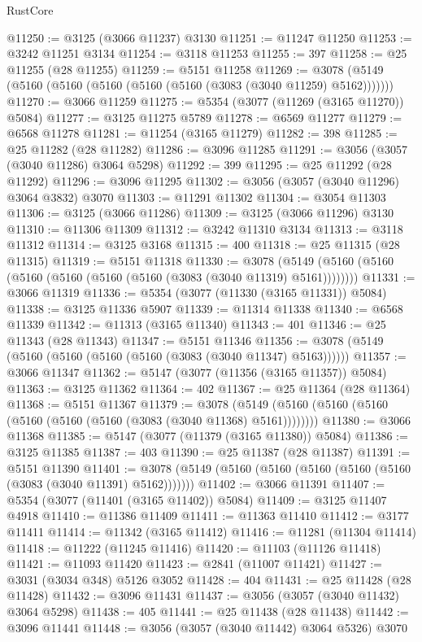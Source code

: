 \begin{lexlean}{RustCore}
\begin{coremodule}
@11250 := @3125 (@3066 @11237) @3130
@11251 := @11247 @11250
@11253 := @3242 @11251 @3134
@11254 := @3118 @11253
@11255 := 397
@11258 := @25 @11255 (@28 @11255)
@11259 := @5151 @11258
@11269 := @3078 (@5149 (@5160 (@5160 (@5160 (@5160 (@5160 (@3083 (@3040 @11259) @5162)))))))
@11270 := @3066 @11259
@11275 := @5354 (@3077 (@11269 (@3165 @11270)) @5084)
@11277 := @3125 @11275 @5789
@11278 := @6569 @11277
@11279 := @6568 @11278
@11281 := @11254 (@3165 @11279)
@11282 := 398
@11285 := @25 @11282 (@28 @11282)
@11286 := @3096 @11285
@11291 := @3056 (@3057 (@3040 @11286) @3064 @5298)
@11292 := 399
@11295 := @25 @11292 (@28 @11292)
@11296 := @3096 @11295
@11302 := @3056 (@3057 (@3040 @11296) @3064 @3832) @3070
@11303 := @11291 @11302
@11304 := @3054 @11303
@11306 := @3125 (@3066 @11286)
@11309 := @3125 (@3066 @11296) @3130
@11310 := @11306 @11309
@11312 := @3242 @11310 @3134
@11313 := @3118 @11312
@11314 := @3125 @3168
@11315 := 400
@11318 := @25 @11315 (@28 @11315)
@11319 := @5151 @11318
@11330 := @3078 (@5149 (@5160 (@5160 (@5160 (@5160 (@5160 (@5160 (@3083 (@3040 @11319) @5161))))))))
@11331 := @3066 @11319
@11336 := @5354 (@3077 (@11330 (@3165 @11331)) @5084)
@11338 := @3125 @11336 @5907
@11339 := @11314 @11338
@11340 := @6568 @11339
@11342 := @11313 (@3165 @11340)
@11343 := 401
@11346 := @25 @11343 (@28 @11343)
@11347 := @5151 @11346
@11356 := @3078 (@5149 (@5160 (@5160 (@5160 (@5160 (@3083 (@3040 @11347) @5163))))))
@11357 := @3066 @11347
@11362 := @5147 (@3077 (@11356 (@3165 @11357)) @5084)
@11363 := @3125 @11362
@11364 := 402
@11367 := @25 @11364 (@28 @11364)
@11368 := @5151 @11367
@11379 := @3078 (@5149 (@5160 (@5160 (@5160 (@5160 (@5160 (@5160 (@3083 (@3040 @11368) @5161))))))))
@11380 := @3066 @11368
@11385 := @5147 (@3077 (@11379 (@3165 @11380)) @5084)
@11386 := @3125 @11385
@11387 := 403
@11390 := @25 @11387 (@28 @11387)
@11391 := @5151 @11390
@11401 := @3078 (@5149 (@5160 (@5160 (@5160 (@5160 (@5160 (@3083 (@3040 @11391) @5162)))))))
@11402 := @3066 @11391
@11407 := @5354 (@3077 (@11401 (@3165 @11402)) @5084)
@11409 := @3125 @11407 @4918
@11410 := @11386 @11409
@11411 := @11363 @11410
@11412 := @3177 @11411
@11414 := @11342 (@3165 @11412)
@11416 := @11281 (@11304 @11414)
@11418 := @11222 (@11245 @11416)
@11420 := @11103 (@11126 @11418)
@11421 := @11093 @11420
@11423 := @2841 (@11007 @11421)
@11427 := @3031 (@3034 @348) @5126 @3052
@11428 := 404
@11431 := @25 @11428 (@28 @11428)
@11432 := @3096 @11431
@11437 := @3056 (@3057 (@3040 @11432) @3064 @5298)
@11438 := 405
@11441 := @25 @11438 (@28 @11438)
@11442 := @3096 @11441
@11448 := @3056 (@3057 (@3040 @11442) @3064 @5326) @3070

\end{coremodule}
\end{lexlean}
